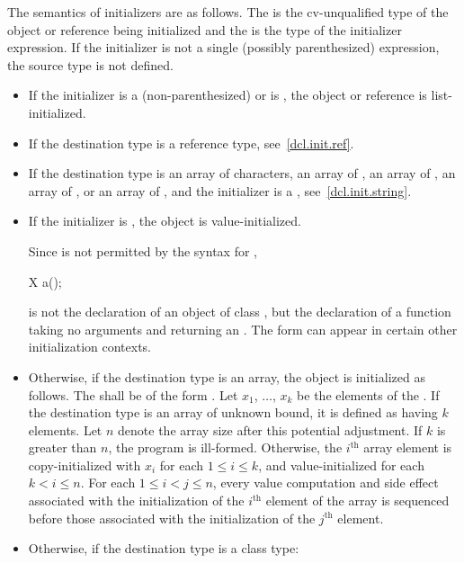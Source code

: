 \pnum
The semantics of initializers are as follows.
The
%
is the cv-unqualified type of the object or reference being initialized and the
is the type of the initializer expression.
If the initializer is not a single (possibly parenthesized) expression, the
source type is not defined.
\begin{itemize}
\item
If the initializer is a (non-parenthesized) 
or is \tcode{=} , the object or reference
is list-initialized.
\item
If the destination type is a reference type, see~\ref{dcl.init.ref}.
\item
If the destination type is an array of characters,
an array of ,
an array of ,
an array of ,
or an array of
,
and the initializer is a , see~\ref{dcl.init.string}.
\item If the initializer is \tcode{()}, the object is value-initialized.
%
\begin{note}
Since
\tcode{()}
is not permitted by the syntax for
,
\begin{codeblock}
X a();
\end{codeblock}
is not the declaration of an object of class
,
but the declaration of a function taking no arguments and returning an
.
The form
\tcode{()}
can appear in certain other initialization contexts.
\end{note}

\item
Otherwise, if the destination type is an array,
the object is initialized as follows.
The  shall be of the form
\tcode{(}  \tcode{)}.
Let $x_1$, $\dotsc$, $x_k$ be
the elements of the .
If the destination type is an array of unknown bound,
it is defined as having $k$ elements.
Let $n$ denote the array size after this potential adjustment.
If $k$ is greater than $n$,
the program is ill-formed.
Otherwise, the $i^\text{th}$ array element is copy-initialized with
$x_i$ for each $1 \leq i \leq k$, and
value-initialized for each $k < i \leq n$.
For each $1 \leq i < j \leq n$,
every value computation and side effect associated with
the initialization of the $i^\text{th}$ element of the array
is sequenced before those associated with
the initialization of the $j^\text{th}$ element.
\item
Otherwise, if the destination type is a class type:


\end{itemize}
